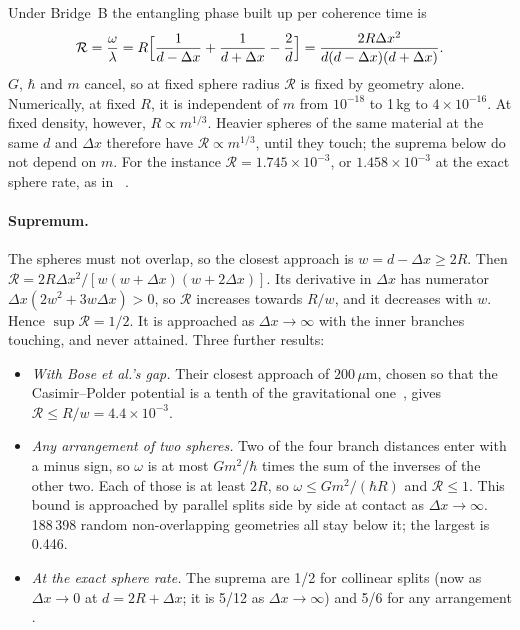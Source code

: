 Under Bridge~B the entangling phase built up per coherence time is
\begin{equation}\label{eq:bmv-rho}
\mathcal R=\frac{\omega}{\lambda}=R\Bigl[\frac1{d-\Delta x}+\frac1{d+\Delta x}-\frac2d\Bigr]=\frac{2R\Delta x^2}{d(d-\Delta x)(d+\Delta x)} .
\end{equation}
$G$, $\hbar$ and $m$ cancel, so at fixed sphere radius $\mathcal R$ is fixed by geometry alone. Numerically, at fixed $R$, it is independent
of $m$ from $10^{-18}$ to 1\,kg to $4\times10^{-16}$. At fixed density, however, $R\propto m^{1/3}$. Heavier spheres of the same material at
the same $d$ and $\Delta x$ therefore have $\mathcal R\propto m^{1/3}$, until they touch; the suprema below do not depend on $m$. For the
instance $\mathcal R=1.745\times10^{-3}$, or $1.458\times10^{-3}$ at the exact sphere rate, as in~ .

\paragraph{Supremum.} The spheres must not overlap, so the closest approach is $w=d-\Delta x\ge2R$. Then
$\mathcal R=2R\Delta x^2/[w(w+\Delta x)(w+2\Delta x)]$. Its derivative in $\Delta x$ has numerator $\Delta x(2w^2+3w\Delta x)>0$, so
$\mathcal R$ increases towards $R/w$, and it decreases with $w$. Hence $\sup\mathcal R=1/2$. It is approached as $\Delta x\to\infty$ with the
inner branches touching, and never attained. Three further results:
\begin{itemize}[nosep]
\item \emph{With Bose et al.'s gap.} Their closest approach of $200\,\mu$m, chosen so that the Casimir--Polder potential is a tenth of the
gravitational one~\cite{bose}, gives $\mathcal R\le R/w=4.4\times10^{-3}$.
\item \emph{Any arrangement of two spheres.} Two of the four branch distances enter with a minus sign, so $\omega$
is at most $Gm^2/\hbar$ times the sum of the inverses of the other two. Each of those is at least $2R$, so $\omega\le Gm^2/(\hbar R)$ and
$\mathcal R\le1$. This bound is approached by parallel splits side by side at
contact as $\Delta x\to\infty$. 188\,398 random non-overlapping geometries all stay below it; the largest is 0.446.
\item \emph{At the exact sphere rate.} The suprema are 1/2 for collinear splits (now as $\Delta x\to0$ at $d=2R+\Delta x$; it is 5/12 as
$\Delta x\to\infty$) and 5/6 for any arrangement .
\end{itemize}

